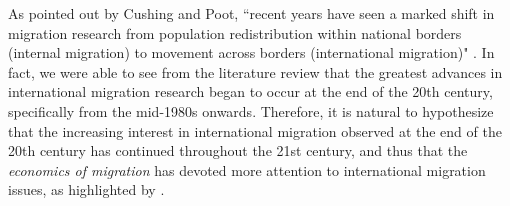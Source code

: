 As pointed out by Cushing and Poot, ``recent years have seen a marked shift in migration research from population redistribution within national borders (internal migration) to movement across borders (international migration)" \citep[p. 318]{cushing_crossing_2004}. In fact, we were able to see from the literature review that the greatest advances in international migration research began to occur at the end of the 20th century, specifically from the mid-1980s onwards. Therefore, it is natural to hypothesize that the increasing interest in international migration observed at the end of the 20th century has continued throughout the 21st century, and thus that the \textit{economics of migration} has devoted more attention to international migration issues, as highlighted by \cite{cushing_crossing_2004}.
